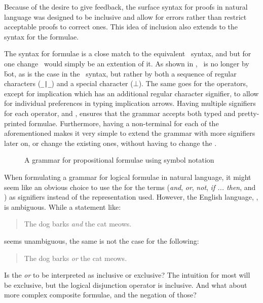 \documentclass[BA.tex]{subfiles}
\begin{document}
Because of the desire to give feedback, the surface syntax for proofs in
natural language was designed to be inclusive and allow for errors rather
than restrict acceptable proofs to correct ones. This idea of inclusion
also extends to the syntax for the formulae.

The  syntax for formulae is a close match to the equivalent
 \bp\ syntax, and but for one change \ours\ would simply be an extention
 of it. As shown in , \abs\ is no longer  by
 \f{bot}, as is the case in the \bp\ syntax, but rather by both a sequence 
 of regular characters (\verb+_|_+) and a special character (\(\bot\)). 
 The same goes for the operators, except for implication which has an
 additional regular character signifier, to allow for individual preferences
 in typing implication arrows. Having multiple signifiers for each
 operator, and , ensures that the grammar
 accepts both typed and pretty-printed formulae. Furthermore, having a
 non-terminal for each of the aforementioned  makes it
 very simple to extend the grammar with more signifiers later on, or change
 the existing ones, without having to change the 
 .

\begin{figure}[!hb]

\caption{A grammar for propositional formulae using symbol notation}
\label{nlform}
\end{figure}

When formulating a grammar for logical formulae in natural language, it
 might seem like an obvious choice to use the 
 for the  terms
 (\emph{and}, \emph{or}, \emph{not}, \emph{if ... then},  and \emph{\abs})
 as signifiers instead of the  representation used. However, 
 the English language, , is
 ambiguous. While a statement like:
 \begin{quote}
    The dog barks \emph{and} the cat meows.
 \end{quote}
 seems unambiguous, the same is not the case for the following:
 \begin{quote}
    The dog barks \emph{or} the cat meows.
 \end{quote}
 Is the \emph{or} to be interpreted as inclusive or exclusive? 
 The intuition for most will be exclusive, but the logical disjunction
 operator is inclusive. And what about more complex composite formulae,
 and the negation of those? 
 
\end{document}
